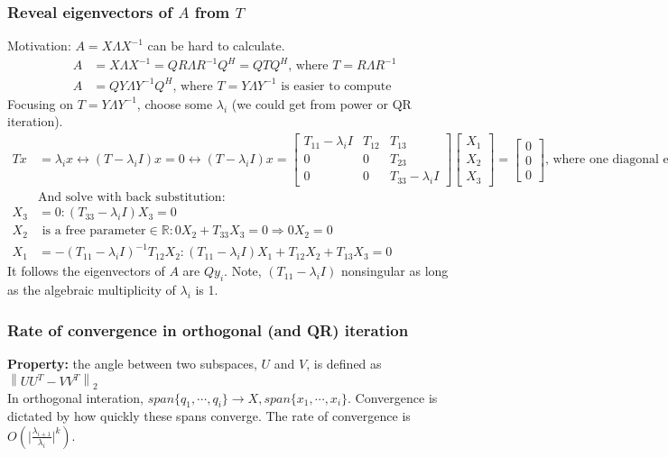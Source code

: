 \documentclass{article}
\newcommand{\norm}[2]{\left\lVert#1\right\rVert_#2}
\newcommand{\abs}[1]{\lvert#1\rvert}
\begin{document}
\subsubsection{Reveal eigenvectors of $A$ from $T$}
Motivation: $A = X\Lambda X^{-1}$ can be hard to calculate.
\begin{align*}
    A &= X\Lambda X^{-1} = QR \Lambda R^{-1}Q^H = QTQ^H \textrm{, where } T = R\Lambda R^{-1}\\
    A &= QY\Lambda Y^{-1}Q^H \textrm{, where $T = Y \Lambda Y^{-1}$ is easier to compute}
\end{align*}
Focusing on $T = Y \Lambda Y^{-1}$, choose some $\lambda_i$ (we could get from power or QR iteration). 
\begin{align*}
    Tx &= \lambda_i x \longleftrightarrow (T - \lambda_i I)x = 0 \longleftrightarrow (T - \lambda_i I)x  = \begin{bmatrix} T_{11} - \lambda_i I & T_{12} & T_{13}\\ 0 & 0 & T_{23}\\
            0 & 0 & T_{33} - \lambda_i I \end{bmatrix} \begin{bmatrix} X_1 \\ X_2 \\ X_3 \end{bmatrix} = \begin{bmatrix} 0 \\ 0 \\ 0 \end{bmatrix} \textrm{, where one diagonal element is 0}\\
    &\textrm{And solve with back substitution:}\\
            X_3 &= 0: (T_{33} - \lambda_i I) X_3 = 0\\
            X_2 &\textrm{ is a free parameter} \in \mathbb{R}: 0X_2 + T_{33}X_3 = 0 \Longrightarrow 0X_2 = 0\\
            X_1 &= -(T_{11}-\lambda_i I)^{-1}T_{12}X_2: (T_{11}-\lambda_i I)X_1 + T_{12}X_2 + T_{13}X_3 = 0
\end{align*}
It follows the eigenvectors of $A$ are $Qy_i$. Note, $(T_{11} - \lambda_i I)$ nonsingular as long as the algebraic multiplicity of $\lambda_i$ is 1.


\subsubsection{Rate of convergence in orthogonal (and QR) iteration}
\textbf{Property:} the angle between two subspaces, $U$ and $V$, is defined as $\norm{UU^T - VV^T}{2}$\\
\noindent In orthogonal interation, $span\{q_1, \cdots, q_i\} \longrightarrow X, span \{x_1, \cdots, x_i\}$. Convergence is dictated by how quickly these spans converge. The rate of convergence is $O(\abs{\frac{\lambda_{i+1}}{\lambda_i}}^k)$.
\end{document}
